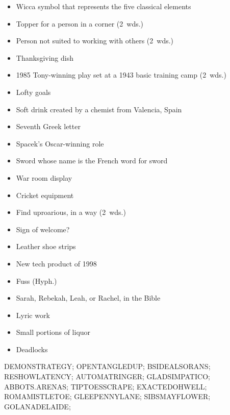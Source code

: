 {\begin{itemize}
    \end{itemize}
  \item
    \begin{itemize}
      \item
        Wicca symbol that represents the five classical elements
      \item
        Topper for a person in a corner (2~wds.)
      \item
        Person not suited to working with others (2~wds.)
      \item
        Thanksgiving dish
      \item
        1985 Tony-winning play set at a 1943 basic training camp (2~wds.)
    \end{itemize}
  \item
    \begin{itemize}
      \item
        Lofty goals
      \item
        Soft drink created by a chemist from Valencia, Spain
      \item
        Seventh Greek letter
      \item
        Spacek's Oscar-winning role
      \item
        Sword whose name is the French word for sword
      \item
        War room display
      \item
        Cricket equipment
    \end{itemize}
  \item
    \begin{itemize}
      \item
        Find uproarious, in a way (2~wds.)
      \item
        Sign of welcome?
      \item
        Leather shoe strips
      \item
        New tech product of 1998
      \item
        Fuss (Hyph.)
    \end{itemize}
  \item
    \begin{itemize}
      \item
        Sarah, Rebekah, Leah, or Rachel, in the Bible
      \item
        Lyric work
      \item
        Small portions of liquor
    \end{itemize}
  \item
    \begin{itemize}
      \item
        Deadlocks
    \end{itemize}
}{%
  \puzzlerow DEMONSTRATEGY;
  \puzzlerow OPENTANGLEDUP;
  \puzzlerow BSIDEALSORANS;
  \puzzlerow RESHOWLATENCY;
  \puzzlerow AUTOMATRINGER;
  \puzzlerow GLADSIMPATICO;
  \puzzlerow ABBOTS.ARENAS;
  \puzzlerow TIPTOESSCRAPE;
  \puzzlerow EXACTEDOHWELL;
  \puzzlerow ROMAMISTLETOE;
  \puzzlerow GLEEPENNYLANE;
  \puzzlerow SIBSMAYFLOWER;
  \puzzlerow GOLANADELAIDE;
}
